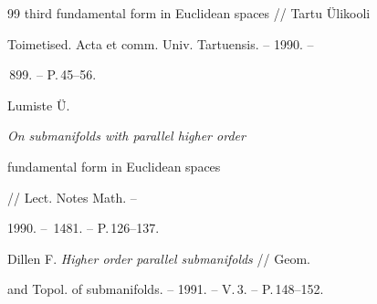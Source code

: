 \begin{thebibliography}{99}
{third fundamental form in Euclidean spaces} // Tartu \"Ulikooli


Toimetised. Acta et comm. Univ. Tartuensis. -- 1990. --


\No\,899. -- P.\,45--56.




Lumiste \"U. {\em On submanifolds with parallel higher order


fundamental form in Euclidean spaces} // Lect. Notes Math. --


1990. -- \No\,1481. -- P.\,126--137.




Dillen F. {\em Higher order parallel submanifolds} // Geom.


and Topol. of submanifolds. -- 1991. -- V.\,3. -- P.\,148--152.





\end{thebibliography}





\vskip 2cm












\label{end}





